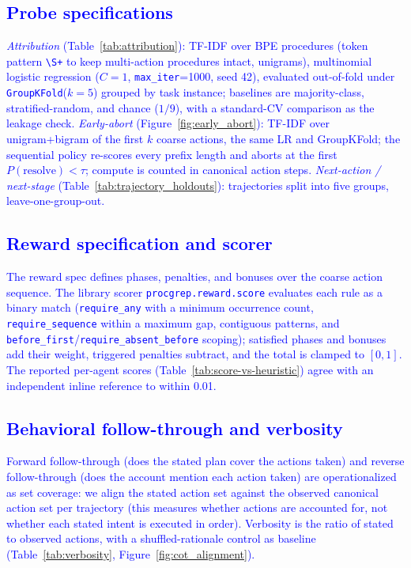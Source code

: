 \documentclass[12pt]{article}
\begin{document}
\subsection{\textcolor{blue}{Probe specifications}}
\textcolor{blue}{\emph{Attribution} (Table~\ref{tab:attribution}): TF-IDF over BPE procedures (token pattern \texttt{\textbackslash S+} to keep multi-action procedures intact, unigrams), multinomial logistic regression ($C{=}1$, \texttt{max\_iter}=1000, seed 42), evaluated out-of-fold under \texttt{GroupKFold}($k{=}5$) grouped by task instance; baselines are majority-class, stratified-random, and chance ($1/9$), with a standard-CV comparison as the leakage check. \emph{Early-abort} (Figure~\ref{fig:early_abort}): TF-IDF over unigram+bigram of the first $k$ coarse actions, the same LR and GroupKFold; the sequential policy re-scores every prefix length and aborts at the first $P(\text{resolve})<\tau$; compute is counted in canonical action steps. \emph{Next-action / next-stage} (Table~\ref{tab:trajectory_holdouts}): trajectories split into five groups, leave-one-group-out.}

\subsection{\textcolor{blue}{Reward specification and scorer}}
\textcolor{blue}{The reward spec defines phases, penalties, and bonuses over the coarse action sequence. The library scorer \texttt{procgrep.reward.score} evaluates each rule as a binary match (\texttt{require\_any} with a minimum occurrence count, \texttt{require\_sequence} within a maximum gap, contiguous patterns, and \texttt{before\_first}/\texttt{require\_absent\_before} scoping); satisfied phases and bonuses add their weight, triggered penalties subtract, and the total is clamped to $[0,1]$. The reported per-agent scores (Table~\ref{tab:score-vs-heuristic}) agree with an independent inline reference to within 0.01.}

\subsection{\textcolor{blue}{Behavioral follow-through and verbosity}}
\textcolor{blue}{Forward follow-through (does the stated plan cover the actions taken) and reverse follow-through (does the account mention each action taken) are operationalized as set coverage: we align the stated action set against the observed canonical action set per trajectory (this measures whether actions are accounted for, not whether each stated intent is executed in order). Verbosity is the ratio of stated to observed actions, with a shuffled-rationale control as baseline (Table~\ref{tab:verbosity}, Figure~\ref{fig:cot_alignment}).}
\end{document}

